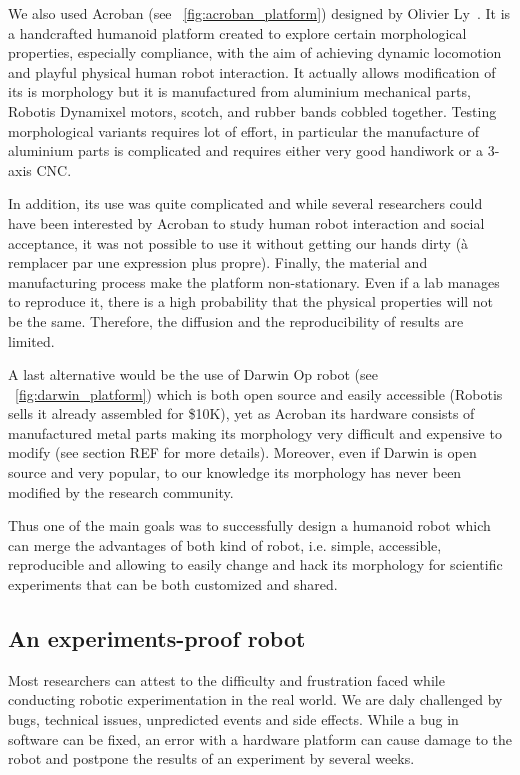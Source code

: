 We also used Acroban (see \figurename~\ref{fig:acroban_platform}) designed by Olivier Ly~\parencite{Ly2010}. It is a handcrafted humanoid platform created to explore certain morphological properties, especially compliance, with the aim of achieving dynamic locomotion and playful physical human robot interaction.
It actually allows modification of its is morphology but it is manufactured from aluminium mechanical parts, Robotis Dynamixel motors, scotch, and rubber bands cobbled together. Testing morphological variants requires lot of effort, in particular the manufacture of aluminium parts is complicated and requires either very good handiwork or a 3-axis CNC.

In addition, its use was quite complicated and while several researchers could have been interested by Acroban to study human robot interaction and social acceptance, it was not possible to use it without getting our hands dirty (à remplacer par une expression plus propre).
Finally, the material and manufacturing process make the platform non-stationary. Even if a lab manages to reproduce it, there is a high probability that the physical properties will not be the same. Therefore, the diffusion and the reproducibility of results are limited.


A last alternative would be the use of Darwin Op robot (see \figurename~\ref{fig:darwin_platform}) which is both open source and easily accessible (Robotis sells it already assembled for \$10K), yet as Acroban its hardware consists of manufactured metal parts making its morphology very difficult and expensive to modify (see section REF for more details). Moreover, even if Darwin is open source and very popular, to our knowledge its morphology has never been modified by the research community.

Thus one of the main goals was to successfully design a humanoid robot which can merge the advantages of both kind of robot, i.e. simple, accessible, reproducible and allowing to easily change and hack its morphology for scientific experiments that can be both customized and shared.


\subsection{An experiments-proof robot} %

Most researchers can attest to the difficulty and frustration faced while conducting robotic experimentation in the real world. We are daly challenged by bugs, technical issues, unpredicted events and side effects. While a bug in software can be fixed, an error with a hardware platform can cause damage to the robot and postpone the results of an experiment by several weeks.

